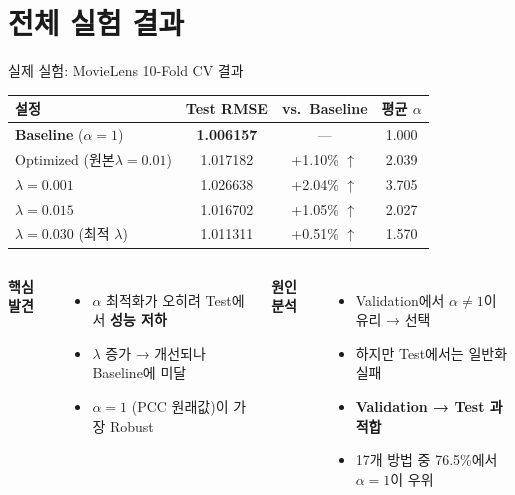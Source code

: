 \documentclass[aspectratio=169, 10pt]{beamer}
\begin{document}
\section{전체 실험 결과}

\begin{frame}[shrink=5]{실제 실험: MovieLens 10-Fold CV 결과}

  \begin{center}
  \renewcommand{\arraystretch}{1.4}
  \begin{tabular}{l|c|cc}
    \toprule
    \textbf{설정} & \textbf{Test RMSE} & vs.\ Baseline & 평균 $\alpha$ \\
    \midrule
    \rowcolor{testgreen!20}
    \textbf{Baseline} ($\alpha = 1$)    & \textbf{1.006157} & — & 1.000 \\
    Optimized (원본\;$\lambda=0.01$)    & 1.017182          & +1.10\% \textcolor{negred}{$\uparrow$} & 2.039 \\
    $\lambda=0.001$                     & 1.026638          & +2.04\% \textcolor{negred}{$\uparrow$} & 3.705 \\
    $\lambda=0.015$                     & 1.016702          & +1.05\% \textcolor{negred}{$\uparrow$} & 2.027 \\
    $\lambda=0.030$ (최적 $\lambda$)    & 1.011311          & +0.51\% \textcolor{negred}{$\uparrow$} & 1.570 \\
    \bottomrule
  \end{tabular}
  \end{center}

  \vspace{0.5em}
  \begin{columns}[T]
      \textbf{핵심 발견}
      \begin{itemize}
        \item $\alpha$ 최적화가 오히려 Test에서 \textbf{성능 저하}
        \item $\lambda$ 증가 → 개선되나 Baseline에 미달
        \item $\alpha=1$ (PCC 원래값)이 가장 Robust
      \end{itemize}

      \textbf{원인 분석}
      \begin{itemize}
        \item Validation에서 $\alpha \neq 1$이 유리 → 선택
        \item 하지만 Test에서는 일반화 실패
        \item \textbf{Validation → Test 과적합}
        \item 17개 방법 중 76.5\%에서 $\alpha=1$이 우위
      \end{itemize}
  \end{columns}
\end{frame}
\end{document}
